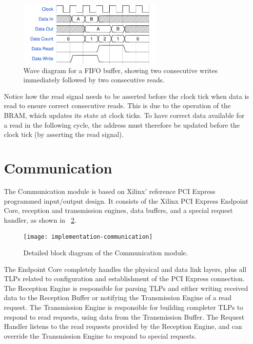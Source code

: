 \begin{figure}[!ht]
    \centering
    \includegraphics[width=0.64\textwidth]{figures/wavediagram-fifo}
    \caption[FIFO buffer wave diagram]{
        Wave diagram for a FIFO buffer, showing two consecutive writes immediately followed by two consecutive reads.
    }
    \label{fig:wavediagram-fifo}
\end{figure}

Notice how the read signal needs to be asserted before the clock tick when data is read to ensure correct consecutive reads.
This is due to the operation of the BRAM, which updates its state at clock ticks.
To have correct data available for a read in the following cycle, the address must therefore be updated before the clock tick (by asserting the read signal).


\section{Communication}

The Communication module is based on Xilinx' reference PCI Express programmed input/output design.
It consists of the Xilinx PCI Express Endpoint Core, reception and transmission engines, data buffers, and a special request handler, as shown in \figurename~\ref{fig:implementation-communication}.

\begin{figure}[!ht]
    \centering
    \texttt{[image: implementation-communication]}
    \caption[Communication module]{
        Detailed block diagram of the Communication module.
    }
    \label{fig:implementation-communication}
\end{figure}

The Endpoint Core completely handles the physical and data link layers, plus all TLPs related to configuration and establishment of the PCI Express connection.
The Reception Engine is responsible for parsing TLPs and either writing received data to the Reception Buffer or notifying the Transmission Engine of a read request.
The Transmission Engine is responsible for building completer TLPs to respond to read requests, using data from the Transmission Buffer.
The Request Handler listens to the read requests provided by the Reception Engine, and can override the Transmission Engine to respond to special requests.

